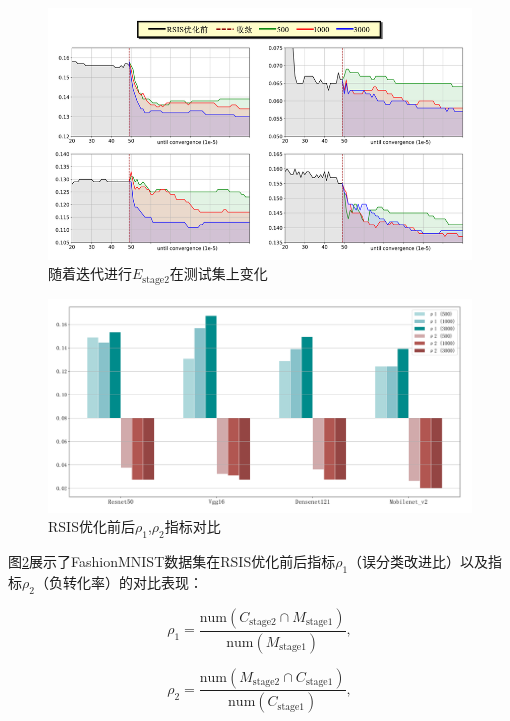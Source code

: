 \documentclass{NauThesis}
\begin{document}
\begin{figure}[htbp]
    \centering
    \includegraphics[width=1.0\textwidth]{figs/fig8.png}
    \caption{随着迭代进行$E_{\text{stage2}}$在测试集上变化}
    \label{fig8}
\end{figure}

\begin{figure}[htbp]
    \centering
    \includegraphics[width=1.0\textwidth]{figs/fig9.png}
    \caption{RSIS优化前后$\rho_1$,$\rho_2$指标对比}
    \label{fig9}
\end{figure}

图\ref{fig9}展示了FashionMNIST数据集在RSIS优化前后指标$\rho_1$（误分类改进比）以及指标$\rho_2$（负转化率）的对比表现：

\begin{equation}\label{equ21}
    \rho_1=\dfrac{\text{num}(C_{\text{stage2}}\cap  M_{\text{stage1}})}{\text{num}(M_{\text{stage1}})},
\end{equation}

\begin{equation}\label{equ22}
    \rho_2=\dfrac{\text{num}(M_{\text{stage2}}\cap C_{\text{stage1}})}{\text{num}(C_{\text{stage1}})},
\end{equation}
\end{document}
